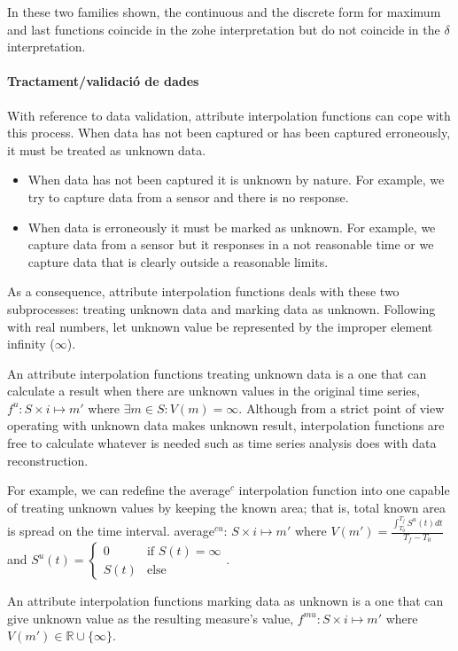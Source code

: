In these two families shown, the continuous and the discrete form for
maximum and last functions coincide in the zohe interpretation but do
not coincide in the $\delta$ interpretation. 


\paragraph{Tractament/validació de dades}\todo{}

With reference to data validation, attribute interpolation functions
can cope with this process. When data has not been captured or has
been captured erroneously, it must be treated as unknown data.
\begin{itemize}
\item When data has not been captured it is unknown by nature. For
  example, we try to capture data from a sensor and there is no
  response.
\item When data is erroneously it must be marked as unknown. For
  example, we capture data from a sensor but it responses in a not
  reasonable time or we capture data that is clearly outside a
  reasonable limits.
\end{itemize}
As a consequence, attribute interpolation functions deals with these
two subprocesses: treating unknown data and marking data as
unknown. Following with real numbers, let unknown value be represented
by the improper element infinity ($\infty$).  

An attribute interpolation functions treating unknown data is a one
that can calculate a result when there are unknown values in the
original time series, $f^u: S \times i \mapsto m'$ where $\exists m \in
S: V(m)=\infty$. Although from a strict point of view
operating with unknown data makes unknown result, interpolation
functions are free to calculate whatever is needed such as time series
analysis does with data reconstruction.

For example, we can redefine the average$^{c}$ interpolation function
into one capable of treating unknown values by keeping the known area;
that is, total known area is spread on the time interval.
average$^{cu}$: $S \times i \mapsto m'$ where $V(m') =
\frac{\int_{T_0}^{T_f} S^u(t)dt}{T_f-T_0}$ and $S^u(t)=
\begin{cases}
  0 &\text{if }  S(t)=\infty\\
  S(t) & \text{else }
\end{cases}$.


An attribute interpolation functions marking data as unknown is a one
that can give unknown value as the resulting measure's value, $f^{mu}:
S \times i \mapsto m'$ where $V(m')\in \mathbb{R}\cup\{\infty\}$.

